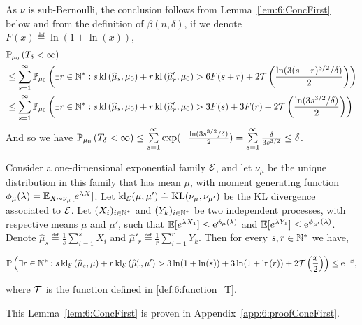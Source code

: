 \begin{smallproof}
As $\nu$ is sub-Bernoulli, the conclusion follows from Lemma~\ref{lem:6:ConcFirst} below and from the definition of $\beta(n,\delta)$, if we denote $F(x) \eqdef \ln(1+\ln(x))$,
%
\begin{align*}
    &\mathbb{P}_{\mu_0}\left(T_{\delta} < \infty\right) \\
    & \leq \sum_{s =1}^{\infty} \mathbb{P}_{\mu_0}\left(\exists r \in \mathbb{N}^* : s \, \mathrm{kl}\left(\widehat{\mu}_{s},\mu_0\right) + r \, \mathrm{kl}\left(\widehat{\mu}'_{r},\mu_0\right) > 6F(s+r)+ 2 \mathcal{T}\left(\frac{\ln(3(s+r)^{3/2}/\delta)}{2}\right)\right)\\
    & \leq \sum_{s =1}^{\infty} \mathbb{P}_{\mu_0}\left(\exists r \in \mathbb{N}^* : s \, \mathrm{kl}\left(\widehat{\mu}_{s},\mu_0\right) + r \, \mathrm{kl}\left(\widehat{\mu}'_{r},\mu_0\right) > 3F(s)+3F(r) + 2 \mathcal{T}\left(\frac{\ln(3s^{3/2}/\delta)}{2}\right)\right)
\end{align*}
%
And so we have
$\mathbb{P}_{\mu_0}\left(T_{\delta} < \infty\right)
\leq \sum\limits_{s =1}^{\infty} \exp(- \frac{\ln(3s^{3/2}/\delta)}{2} )
= \sum\limits_{s =1}^{\infty} \frac{\delta}{3s^{3/2}}
\leq \delta$.
%
\end{smallproof}

\begin{lemma}\label{lem:6:ConcFirst}
\begin{leftbar}[lemmabar]  %
    Consider a one-dimensional exponential family $\mathcal{E}$,
    and let $\nu_{\mu}$ be the unique distribution in this family that has mean $\mu$,
    with moment generating function $\phi_\mu(\lambda) = \mathbb{E}_{X \sim \nu_{\mu}}[e^{\lambda X}]$.
    Let $\mathrm{kl}_{\mathcal{E}}(\mu,\mu') \overset{.}{=} \mathrm{KL}(\nu_{\mu},\nu_{\mu'})$ be the KL divergence associated to $\mathcal{E}$.
    Let $(X_i)_{i \in \mathbb{N}^*}$ and $(Y_k)_{i \in \mathbb{N}^*}$ be two independent \iid{} processes, with respective means $\mu$ and $\mu'$, such that
    $\mathbb{E}[e^{\lambda X_1}] \leq \mathrm{e}^{\phi_{\mu}(\lambda)}$ and $\mathbb{E}[e^{\lambda Y_1}] \leq \mathrm{e}^{\phi_{\mu'}(\lambda)}$.
    Denote $\widehat{\mu}_s \eqdef \frac{1}{s}\sum\limits_{i=1}^s X_i$ and $\widehat{\mu}'_r \eqdef \frac{1}{r}\sum\limits_{i=1}^r Y_k$.
    Then for every $s,r \in \mathbb{N}^*$ we have,
    \begin{small}
        \begin{equation}
            \mathbb{P}\left(\exists r \in \mathbb{N}^* : s \, \mathrm{kl}_{\mathcal{E}}\left(\widehat{\mu}_{s},\mu\right) + r \, \mathrm{kl}_{\mathcal{E}}\left(\widehat{\mu}_r',\mu'\right) > 3\ln(1+\ln(s)) + 3\ln(1+\ln(r)) + 2\mathcal{T}\left(\frac{x}{2}\right)\right)\leq \mathrm{e}^{-x},
        \end{equation}
    \end{small}
    where $\mathcal{T}$ is the function defined in \eqref{def:6:function_T}.
\end{leftbar}  %
\end{lemma}
\begin{smallproof}
    This Lemma~\ref{lem:6:ConcFirst} is proven in Appendix~\ref{app:6:proofConcFirst}.
\end{smallproof}


